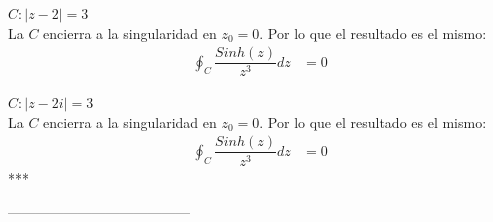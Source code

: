 \documentclass[10pt,a4paper]{article}
\begin{document}
\begin{enumerate}
\begin{enumerate}
\begin{profesor}
$C: |z-2|=3$\\ 
La $C$ encierra a la singularidad en $z_0=0$. Por lo que el resultado es el mismo:
\begin{align}
\oint_C\dfrac{Sinh(z)}{z^3}dz& = \boxed{0}
\end{align}

$C: |z-2i|=3$\\ 
La $C$ encierra a la singularidad en $z_0=0$. Por lo que el resultado es el mismo:
\begin{align}
\oint_C\dfrac{Sinh(z)}{z^3}dz& = \boxed{0}
\end{align}
***
\end{profesor}

\end{enumerate}


\end{enumerate}
\begin{center}
	---------------------------------------
\end{center}
\end{document}
